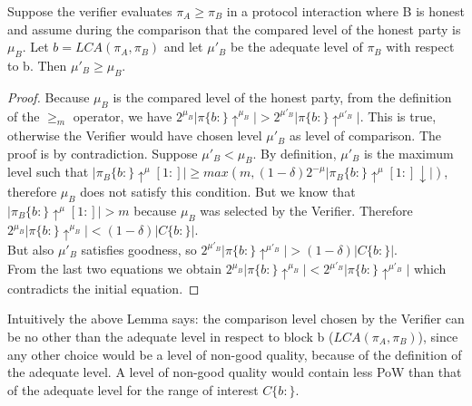\begin{lemma}
	Suppose the verifier evaluates $\pi_A \geq \pi_B$ in a
	protocol interaction where B is honest and assume during the comparison that the
	compared level of the honest party is $\mu_B$. Let $b = LCA(\pi_A, \pi_B)$ and
	let ${\mu}'_B$ be the adequate level of $\pi_B$ with respect to b. Then ${\mu}'_B
	\geq \mu_B$.
	\label{lemm:greatest_adequate}
\end{lemma}
\begin{proof}
	Because $\mu_B$ is the compared level of the honest party, from
	the definition of the $\geq_m$ operator, we have $2^{\mu_B} \vert \pi\{b:\}\uparrow^{\mu_B}
	\vert > 2^{{\mu}'_B} \vert \pi\{b:\}\uparrow^{{\mu}'_B} \vert $. This is true,
	otherwise the Verifier would have chosen level $\mu'_B$ as level of comparison.
	The proof is by contradiction. Suppose $\mu'_B < \mu_B$.
	By definition, $\mu'_B$ is the maximum level such that $\vert \pi_B\{b:\}\uparrow^\mu
	[1:] \vert \geq max(m, (1-\delta)2^{-\mu}\vert \pi_B\{b:\}\uparrow^\mu [1:]\downarrow
	\vert)$, therefore $\mu_B$ does not satisfy this condition.
	But we know that $\vert \pi_B\{b:\}\uparrow^\mu [1:] \vert > m$ because
	$\mu_B$ was selected by the Verifier.
	Therefore $ 2^{\mu_B} \vert \pi\{b:\}\uparrow^{\mu_B} \vert < (1-\delta)\vert
	C\{b:\}\vert $. \\
	But also $\mu'_B$ satisfies goodness, so $ 2^{\mu'_B} \vert \pi\{b:\}\uparrow^{\mu'_B}
	\vert > (1-\delta)\vert C\{b:\}\vert $.\\ From the last two equations we obtain
	$ 2^{\mu_B} \vert \pi\{b:\}\uparrow^{\mu_B} \vert < 2^{\mu'_B} \vert
	\pi\{b:\}\uparrow^{\mu'_B} \vert$ which contradicts the initial equation.
\end{proof}

Intuitively the above Lemma says: the comparison level chosen by the Verifier can be
no other than the adequate level in respect to block b ($LCA(\pi_A, \pi_B)$), since
any other choice would be a level of non-good quality, because of the definition of
the adequate level. A level of non-good quality would contain less PoW than that of
the adequate level for the range of interest $C\{b:\}$. \\

